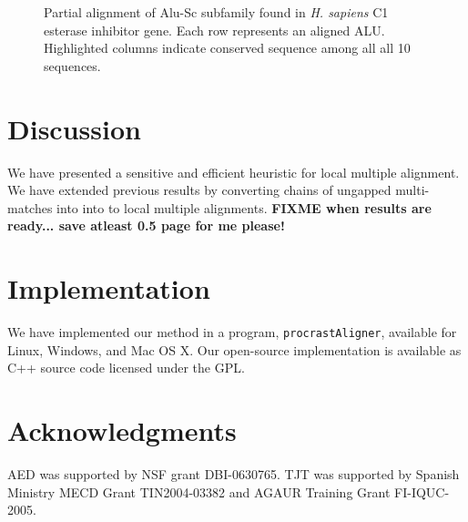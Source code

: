 \documentclass{ws-procs975x65}
\begin{document}
\begin{figure}[t]
\centering {}
\caption{Partial alignment of Alu-Sc subfamily found in \emph{H. sapiens} C1 esterase inhibitor gene. Each row represents an aligned ALU. Highlighted columns indicate conserved sequence among all all 10 sequences.}
\label{fig-align}
\end{figure}

\section{Discussion}

We have presented a sensitive and efficient heuristic for local multiple alignment.
We have extended previous results by converting chains of ungapped multi-matches into  into to local multiple alignments. \textbf{FIXME when results are ready... save atleast 0.5 page for me please!}

\section{Implementation}
We have implemented our method in a program, \texttt{procrastAligner}, available for Linux, Windows, and Mac OS X. Our open-source implementation is available as C++ source code licensed under the GPL.

\section{ Acknowledgments }
AED was supported by NSF grant DBI-0630765. TJT was
supported by Spanish Ministry MECD Grant TIN2004-03382 and AGAUR
Training Grant FI-IQUC-2005.




\end{document}
